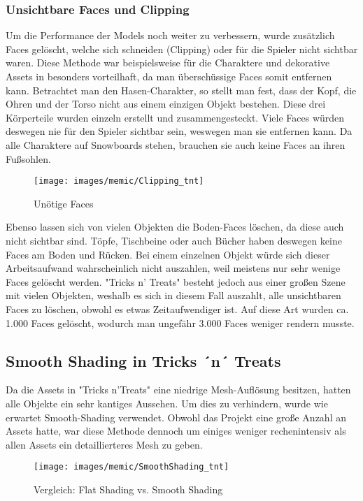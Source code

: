 \subsubsection{Unsichtbare Faces und Clipping}

Um die Performance der Models noch weiter zu verbessern, wurde zusätzlich Faces gelöscht, welche sich schneiden (Clipping) oder für die Spieler nicht sichtbar waren. Diese Methode war beispielsweise für die Charaktere und dekorative Assets in besonders vorteilhaft, da man überschüssige Faces somit entfernen kann.
Betrachtet man den Hasen-Charakter, so stellt man fest, dass der Kopf, die Ohren und der Torso nicht aus einem einzigen Objekt bestehen. Diese drei Körperteile wurden einzeln erstellt und zusammengesteckt. Viele Faces würden deswegen nie für den Spieler sichtbar sein, weswegen man sie entfernen kann. Da alle Charaktere auf Snowboards stehen, brauchen sie auch keine Faces an ihren Fußsohlen.

\begin{figure}[H]
	\centering
	\texttt{[image: images/memic/Clipping\_tnt]}
	\caption{Unötige Faces}
\end{figure}

Ebenso lassen sich von vielen Objekten die Boden-Faces löschen, da diese auch nicht sichtbar sind. Töpfe, Tischbeine oder auch Bücher haben deswegen keine Faces am Boden und Rücken.
Bei einem einzelnen Objekt würde sich dieser Arbeitsaufwand wahrscheinlich nicht auszahlen, weil meistens nur sehr wenige Faces gelöscht werden. "Tricks n’ Treats" besteht jedoch aus einer großen Szene mit vielen Objekten, weshalb es sich in diesem Fall auszahlt, alle unsichtbaren Faces zu löschen, obwohl es etwas Zeitaufwendiger ist. Auf diese Art wurden ca. 1.000 Faces gelöscht, wodurch man ungefähr 3.000 Faces weniger rendern musste.

\subsection{Smooth Shading in Tricks ´n´ Treats}

Da die Assets in "Tricks n’Treats" eine niedrige Mesh-Auflösung besitzen, hatten alle Objekte ein sehr kantiges Aussehen. Um dies zu verhindern, wurde wie erwartet Smooth-Shading verwendet. Obwohl das Projekt eine große Anzahl an Assets hatte, war diese Methode dennoch um einiges weniger rechenintensiv als allen Assets ein detaillierteres Mesh zu geben.

\begin{figure}[H]
	\centering
	\texttt{[image: images/memic/SmoothShading\_tnt]}
	\caption{Vergleich: Flat Shading vs. Smooth Shading}
\end{figure}


